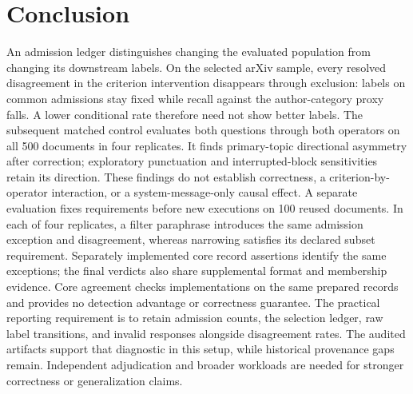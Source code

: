 \documentclass[11pt]{article}
\begin{document}
\section{Conclusion}
An admission ledger distinguishes changing the evaluated population from
changing its downstream labels. On the selected arXiv sample, every resolved
disagreement in the criterion intervention disappears through exclusion:
labels on common admissions stay fixed while recall against the author-category
proxy falls. A lower conditional rate therefore need not show better labels.
The subsequent matched control evaluates both questions through both operators
on all 500 documents in four replicates. It finds primary-topic directional
asymmetry after correction; exploratory punctuation and interrupted-block
sensitivities retain its direction. These findings do not establish correctness,
a criterion-by-operator interaction, or a system-message-only causal effect.
A separate evaluation fixes requirements before new executions on 100 reused
documents. In each of four replicates, a filter paraphrase introduces the
same admission exception and disagreement, whereas narrowing satisfies its
declared subset requirement. Separately implemented core record assertions
identify the same exceptions; the final verdicts also share supplemental
format and membership evidence. Core agreement checks implementations on
the same prepared records and provides no detection advantage or correctness
guarantee.
The practical reporting requirement is to retain admission counts, the
selection ledger, raw label transitions, and invalid responses alongside
disagreement rates. The audited artifacts support that diagnostic in this
setup, while historical provenance gaps remain. Independent adjudication and
broader workloads are needed for stronger correctness or generalization claims.
\end{document}

